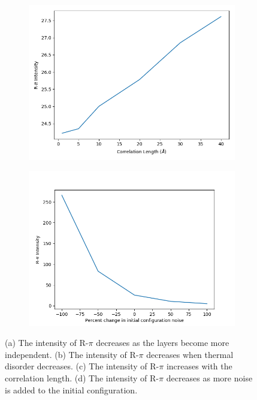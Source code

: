 \documentclass{article}
\begin{document}
\begin{figure}
\begin{subfigure}{0.45\textwidth}
  \caption{}\label{fig:td}
  \end{subfigure}
  \begin{subfigure}{0.45\textwidth} 
  \includegraphics[width=\textwidth]{cl.png}
  \caption{}\label{fig:cl}
  \end{subfigure}
  \begin{subfigure}{0.45\textwidth} 
  \includegraphics[width=\textwidth]{IC.png}
  \caption{}\label{fig:IC}
  \end{subfigure}
  \caption{(a) The intensity of R-$\pi$ decreases as the layers become more
  independent. (b) The intensity of R-$\pi$ decreases when thermal disorder
  decreases. (c) The intensity of R-$\pi$ increases with the correlation length.
  (d) The intensity of R-$\pi$ decreases as more noise is added to the initial
  configuration.}\label{fig:sim_comp}
  \end{figure}
\end{document}
